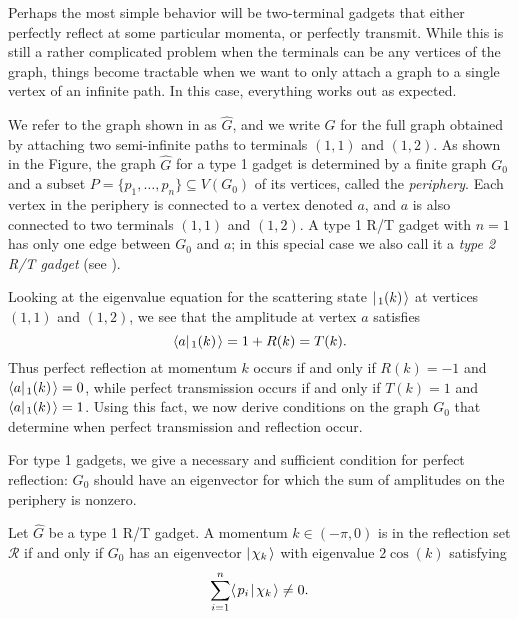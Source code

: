 \documentclass[../thesis-main/thesis-main]{subfiles}
\begin{document}

Perhaps the most simple behavior will be two-terminal gadgets that either perfectly reflect at some particular momenta, or perfectly transmit.  While this is still a rather complicated problem when the terminals can be any vertices of the graph, things become tractable when we want to only attach a graph to a single vertex of an infinite path.  In this case, everything works out as expected.

We refer to the graph shown in  as $\hat{G}$, and we write $G$ for the full graph obtained by attaching two semi-infinite paths to terminals $(1,1)$ and $(1,2)$.  As shown in the Figure, the graph $\hat{G}$ for a type 1 gadget is determined by a finite graph $G_0$ and a subset $P = \{p_1,\ldots,p_n\} \subseteq V(G_0)$ of its vertices, called the \emph{periphery}.  Each vertex in the periphery is connected to a vertex denoted $a$, and $a$ is also connected to two terminals $(1,1)$ and $(1,2)$. A type 1 R/T gadget with $n=1$ has only one edge between $G_0$ and $a$; in this special case we also call it a \emph{type 2 R/T gadget} (see ).

Looking at the eigenvalue equation for the scattering state $|\mspace{2mu} \sc_{1} (k) \mspace{2mu} \rangle$ at vertices $(1,1)$ and $(1,2)$, we see that the amplitude at vertex $a$ satisfies
\[
  \langle{a}|\mspace{2mu} \sc_{1} (k) \mspace{2mu} \rangle = 1 + R(k) = T(k).
\] 
Thus perfect reflection at momentum $k$ occurs if and only if $R(k)=-1$ and $\langle{a}|\mspace{2mu} \sc_{1} (k) \mspace{2mu} \rangle=0$, while perfect transmission occurs if and only if $T(k)=1$ and $\langle{a}|\mspace{2mu} \sc_{1} (k) \mspace{2mu} \rangle=1$. Using this fact, we now derive conditions on the graph $G_0$ that determine when perfect transmission and reflection occur.

For type 1 gadgets, we give a necessary and sufficient condition for perfect reflection: $G_0$ should have an eigenvector for which the sum of amplitudes on the periphery is nonzero.

\begin{lemma}\label{lem:reflect_reqs}
Let $\hat{G}$ be a type 1 R/T gadget. A momentum $k\in (-\pi,0)$ is in the reflection set $\mathcal{R}$ if and only if $G_0$ has an eigenvector $|\mspace{2mu} \chi_k \mspace{2mu} \rangle$ with eigenvalue $2\cos(k)$ satisfying
\begin{equation}
  \sum_{i=1}^{n} \langle\mspace{2mu} p_i \mspace{2mu} | \mspace{2mu} \chi_k\mspace{2mu} \rangle \neq 0. \label{eq:sum_condition}
\end{equation}
\end{lemma}
\end{document}
